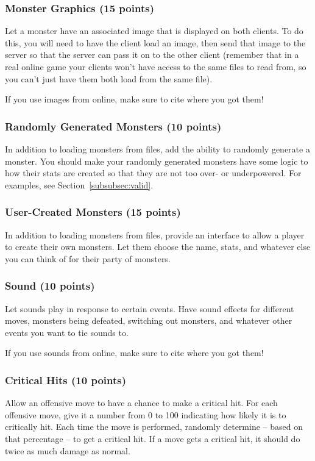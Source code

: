 \documentclass[11pt]{cselabheader}
\begin{document}
\subsubsection{Monster Graphics (15 points)}
Let a monster have an associated image that is displayed on both clients.  To do
this, you will need to have the client load an image, then send that image to
the server so that the server can pass it on to the other client (remember that
in a real online game your clients won't have access to the same files to read
from, so you can't just have them both load from the same file).

If you use images from online, make sure to cite where you got them!

\subsubsection{Randomly Generated Monsters (10 points)}
In addition to loading monsters from files, add the ability to randomly
generate a monster. You should make your randomly generated monsters have
some logic to how their stats are created so that they are not too over-
or underpowered. For examples, see Section~\ref{subsubsec:valid}.

\subsubsection{User-Created Monsters (15 points)}
In addition to loading monsters from files, provide an interface to allow a
player to create their own monsters. Let them choose the name, stats, and
whatever else you can think of for their party of monsters.

\subsubsection{Sound (10 points)}
Let sounds play in response to certain events. Have sound effects for different
moves, monsters being defeated, switching out monsters, and whatever other
events you want to tie sounds to.

If you use sounds from online, make sure to cite where you got them!

\subsubsection{Critical Hits (10 points)}
Allow an offensive move to have a chance to make a critical hit. For each
offensive move, give it a number from 0 to 100 indicating how likely it is to
critically hit. Each time the move is performed, randomly determine -- based on
that percentage -- to get a critical hit. If a move gets a critical hit, it
should do twice as much damage as normal.
\end{document}
